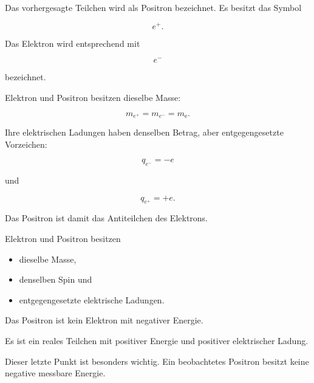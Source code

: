 Das vorhergesagte Teilchen wird als Positron%
 bezeichnet. Es besitzt das Symbol

\begin{equation}
	e^+.
\end{equation}

Das Elektron wird entsprechend mit

\begin{equation}
	e^-
\end{equation}

bezeichnet.

Elektron und Positron besitzen dieselbe Masse:

\begin{equation}
	m_{e^+}
	=
	m_{e^-}
	=
	m_{\mathrm e}.
	\label{eq:massen_elektron_positron}
\end{equation}

Ihre elektrischen Ladungen haben denselben Betrag, aber
entgegengesetzte Vorzeichen:

\begin{equation}
	q_{e^-}
	=
	-e
\end{equation}

und

\begin{equation}
	q_{e^+}
	=
	+e.
	\label{eq:ladungen_elektron_positron}
\end{equation}

Das Positron ist damit das Antiteilchen%
 des Elektrons.

\begin{PhysicsBox}
	\label{box:elektron_und_positron}
	
	Elektron und Positron besitzen
	
	\begin{itemize}
		\item dieselbe Masse,
		\item denselben Spin und
		\item entgegengesetzte elektrische Ladungen.
	\end{itemize}
	
	Das Positron ist kein Elektron mit negativer Energie.
	
	Es ist ein reales Teilchen mit positiver Energie und positiver
	elektrischer Ladung.
\end{PhysicsBox}

Dieser letzte Punkt ist besonders wichtig. Ein beobachtetes Positron
besitzt keine negative messbare Energie.

